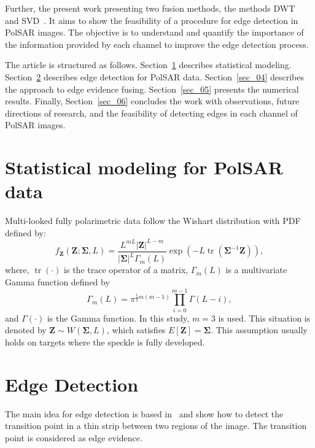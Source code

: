 \documentclass[journal]{IEEEtran}
\DeclareMathOperator{\traco}{tr}
\begin{document}
Further, the present work presenting two fusion methods, the methods DWT~\cite{n_r} and SVD~\cite{naidu}. It aims to show the feasibility of a procedure for edge detection in PolSAR images. The objective is to understand and quantify the importance of the information provided by each channel to improve the edge detection process.

The article is structured as follows.
Section~\ref{sec_02} describes statistical modeling.
Section~\ref{sec_03} describes edge detection for PolSAR data.
Section~\ref{sec_04} describes the approach to edge evidence fusing.
Section~\ref{sec_05} presents the numerical results.
Finally, Section~\ref{sec_06} concludes the work with observations, future directions of research, and the feasibility of detecting edges in each channel of PolSAR images.

\section{Statistical modeling for PolSAR data}\label{sec_02}
Multi-looked fully polarimetric data follow the Wishart distribution with PDF defined by:
\begin{equation}
    f_{\mathbf{Z}}(\mathbf{Z};\mathbf{\Sigma},L)=\frac{L^{mL}|\mathbf{Z}|^{L-m}}{|\mathbf{\Sigma}|^{L}\Gamma_m(L)} \exp(-L\traco(\mathbf{\Sigma}^{-1}\mathbf{Z})),
    \label{eq_04}
\end{equation} 
where, $\traco(\cdot)$ is the trace operator of a matrix, $\Gamma_m(L)$ is a multivariate Gamma function defined by
\begin{equation*}
	\Gamma_m(L)=\pi^{\frac{1}{2}m(m-1)} \prod_{i=0}^{m-1}\Gamma(L-i),
\end{equation*}
and $\Gamma(\cdot)$ is the Gamma function.
In this study, $m=3$ is used. 
This situation is denoted by $\mathbf{Z}\sim W(\mathbf{\Sigma}, L)$, which satisfies $E[\mathbf{Z}]=\mathbf{\Sigma}$. 
This assumption usually holds on targets where the speckle is fully developed.

\section{Edge Detection}\label{sec_03}
The main idea for edge detection is based in~\cite{gmbf, fbgm, nhfc} and show how to detect the transition point in a thin strip between two regions of the image. The transition point is considered as edge evidence. 
\end{document}
